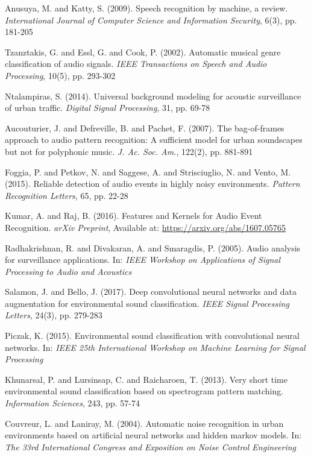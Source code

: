\documentclass[final,3p,times,twocolumn]{elsarticle}
\begin{document}
\begin{thebibliography}{09}
Anusuya, M. and Katty, S. (2009).  Speech recognition by machine, a review. \textit{International Journal of Computer Science and Information Security}, 6(3), pp. 181-205

Tzanztakis, G. and Essl, G. and Cook, P. (2002). Automatic musical genre classification of audio signals. \textit{IEEE Transactions on Speech and Audio Processing}, 10(5), pp. 293-302

Ntalampiras, S. (2014). Universal background modeling for acoustic surveillance of urban traffic. \textit{Digital Signal Processing}, 31, pp. 69-78

Aucouturier, J. and Defreville, B. and Pachet, F. (2007). The bag-of-frames approach to audio pattern recognition: A sufficient model for urban soundscapes but not for polyphonic music. \textit{J. Ac. Soc. Am.}, 122(2), pp. 881-891

Foggia, P. and Petkov, N. and Saggese, A. and Strisciuglio, N. and Vento, M. (2015). Reliable detection of audio events in highly noisy environments. \textit{Pattern Recognition Letters}, 65, pp. 22-28

Kumar, A. and Raj, B. (2016). Features and Kernels for Audio Event Recognition. \textit{arXiv Preprint}, Available at: \url{https://arxiv.org/abs/1607.05765}

Radhakrishnan, R. and Divakaran, A. and Smaragdis, P. (2005). Audio analysis for surveillance applications. In: \textit{IEEE Workshop on Applications of Signal Processing to Audio and Acoustics}

Salamon, J. and Bello, J. (2017). Deep convolutional neural networks and data augmentation for environmental sound classification. \textit{IEEE Signal Processing Letters}, 24(3), pp. 279-283

Piczak, K. (2015). Environmental sound classification with convolutional neural networks. In: \textit{IEEE 25th International Workshop on Machine Learning for Signal Processing}

Khunarsal, P. and Lursinsap, C. and Raicharoen, T. (2013). Very short time environmental sound classification based on spectrogram pattern matching. \textit{Information Sciences}, 243, pp. 57-74

Couvreur, L. and Laniray, M. (2004). Automatic noise recognition in urban environments based on artificial neural networks and hidden markov models. In: \textit{The 33rd International Congress and Exposition on Noise Control Engineering}


\end{thebibliography}
\end{document}
